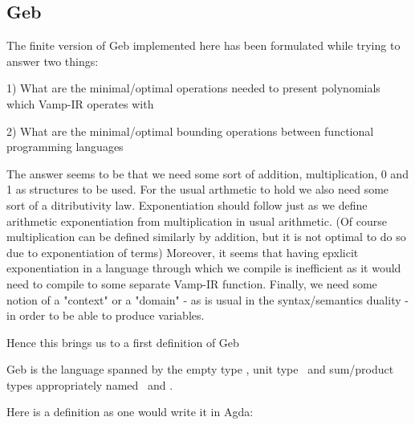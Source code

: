 \subsection{Geb}

The finite version of Geb implemented here has been formulated while trying to answer two things: 

1) What are the minimal/optimal operations needed to present polynomials which Vamp-IR operates with

2) What are the minimal/optimal bounding operations between functional programming languages

The answer seems to be that we need some sort of addition, multiplication, 0 and 1 as structures to be used. For the usual arthmetic to hold we also need some sort of a ditributivity law. Exponentiation should follow just as we define arithmetic exponentiation from multiplication in usual arithmetic. (Of course multiplication can be defined similarly by addition, but it is not optimal to do so due to exponentiation of terms) Moreover, it seems that having epxlicit exponentiation in a language through which we compile is inefficient as it would need to compile to some separate Vamp-IR function. Finally, we need some notion of a "context" or a "domain" - as is usual in the syntax/semantics duality - in order to be able to produce variables.

Hence this brings us to a first definition of Geb

\begin{definition}
Geb is the language spanned by the empty type , unit type \gebterm \, and sum/product types appropriately named \gebcoprod \,  and \gebprod.
\end{definition}


Here is a definition as one would write it in Agda:

